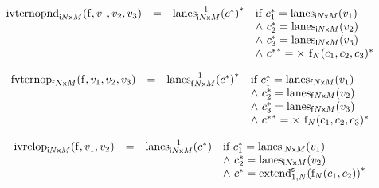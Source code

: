 \vspace{1ex}

$$
\begin{array}[t]{@{}lcl@{}l@{}}
{{\mathrm{ivternopnd}}}_{{{\mathsf{i}}{N}}{\mathsf{x}}{M}}({\mathrm{f}}, v_1, v_2, v_3) & = & {{{{{\mathrm{lanes}}}_{{{\mathsf{i}}{N}}{\mathsf{x}}{M}}^{{-1}}}}{({c^\ast})}^\ast} & \quad
\begin{array}[t]{@{}l@{}}
\mbox{if}~ {c_1^\ast} = {{\mathrm{lanes}}}_{{{\mathsf{i}}{N}}{\mathsf{x}}{M}}(v_1) \\
{\land}~ {c_2^\ast} = {{\mathrm{lanes}}}_{{{\mathsf{i}}{N}}{\mathsf{x}}{M}}(v_2) \\
{\land}~ {c_3^\ast} = {{\mathrm{lanes}}}_{{{\mathsf{i}}{N}}{\mathsf{x}}{M}}(v_3) \\
{\land}~ {{c^\ast}^\ast} = {\Large\times}~{{{\mathrm{f}}}_{N}(c_1, c_2, c_3)^\ast} \\
\end{array} \\
\end{array}
$$

$$
\begin{array}[t]{@{}lcl@{}l@{}}
{{\mathrm{fvternop}}}_{{{\mathsf{f}}{N}}{\mathsf{x}}{M}}({\mathrm{f}}, v_1, v_2, v_3) & = & {{{{{\mathrm{lanes}}}_{{{\mathsf{f}}{N}}{\mathsf{x}}{M}}^{{-1}}}}{({c^\ast})}^\ast} & \quad
\begin{array}[t]{@{}l@{}}
\mbox{if}~ {c_1^\ast} = {{\mathrm{lanes}}}_{{{\mathsf{f}}{N}}{\mathsf{x}}{M}}(v_1) \\
{\land}~ {c_2^\ast} = {{\mathrm{lanes}}}_{{{\mathsf{f}}{N}}{\mathsf{x}}{M}}(v_2) \\
{\land}~ {c_3^\ast} = {{\mathrm{lanes}}}_{{{\mathsf{f}}{N}}{\mathsf{x}}{M}}(v_3) \\
{\land}~ {{c^\ast}^\ast} = {\Large\times}~{{{\mathrm{f}}}_{N}(c_1, c_2, c_3)^\ast} \\
\end{array} \\
\end{array}
$$

\vspace{1ex}

$$
\begin{array}[t]{@{}lcl@{}l@{}}
{{\mathrm{ivrelop}}}_{{{\mathsf{i}}{N}}{\mathsf{x}}{M}}({\mathrm{f}}, v_1, v_2) & = & {{{{\mathrm{lanes}}}_{{{\mathsf{i}}{N}}{\mathsf{x}}{M}}^{{-1}}}}{({c^\ast})} & \quad
\begin{array}[t]{@{}l@{}}
\mbox{if}~ {c_1^\ast} = {{\mathrm{lanes}}}_{{{\mathsf{i}}{N}}{\mathsf{x}}{M}}(v_1) \\
{\land}~ {c_2^\ast} = {{\mathrm{lanes}}}_{{{\mathsf{i}}{N}}{\mathsf{x}}{M}}(v_2) \\
{\land}~ {c^\ast} = {{{{{\mathrm{extend}}}_{1, N}^{\mathsf{s}}}}{({{\mathrm{f}}}_{N}(c_1, c_2))}^\ast} \\
\end{array} \\
\end{array}
$$

